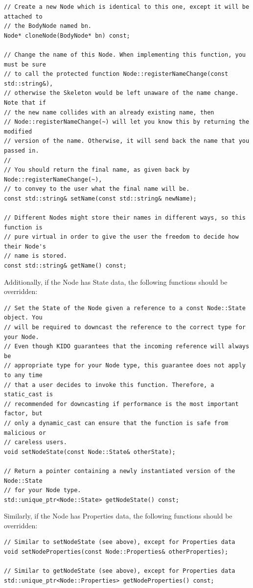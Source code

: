 \begin{lstlisting}
// Create a new Node which is identical to this one, except it will be attached to
// the BodyNode named bn.
Node* cloneNode(BodyNode* bn) const;

// Change the name of this Node. When implementing this function, you must be sure
// to call the protected function Node::registerNameChange(const std::string&),
// otherwise the Skeleton would be left unaware of the name change. Note that if
// the new name collides with an already existing name, then
// Node::registerNameChange(~) will let you know this by returning the modified
// version of the name. Otherwise, it will send back the name that you passed in.
//
// You should return the final name, as given back by Node::registerNameChange(~),
// to convey to the user what the final name will be.
const std::string& setName(const std::string& newName);

// Different Nodes might store their names in different ways, so this function is
// pure virtual in order to give the user the freedom to decide how their Node's
// name is stored.
const std::string& getName() const;
\end{lstlisting}

Additionally, if the Node has State data, the following functions should be overridden:

\begin{lstlisting}
// Set the State of the Node given a reference to a const Node::State object. You
// will be required to downcast the reference to the correct type for your Node.
// Even though KIDO guarantees that the incoming reference will always be
// appropriate type for your Node type, this guarantee does not apply to any time
// that a user decides to invoke this function. Therefore, a static_cast is
// recommended for downcasting if performance is the most important factor, but
// only a dynamic_cast can ensure that the function is safe from malicious or
// careless users.
void setNodeState(const Node::State& otherState);

// Return a pointer containing a newly instantiated version of the Node::State
// for your Node type.
std::unique_ptr<Node::State> getNodeState() const;
\end{lstlisting}

Similarly, if the Node has Properties data, the following functions should be overridden:

\begin{lstlisting}
// Similar to setNodeState (see above), except for Properties data
void setNodeProperties(const Node::Properties& otherProperties);

// Similar to getNodeState (see above), except for Properties data
std::unique_ptr<Node::Properties> getNodeProperties() const;
\end{lstlisting}

